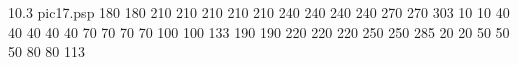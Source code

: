  10.3 pic17.psp 
{}{}{
 180 
 180 
 210 
 210 
 210 
 210 
 210 
 240 
 240 
 240 
 240 
 270 
 270 
 303 
 10 
 10 
 40 
 40 
 40 
 40 
 40 
 70 
 70 
 70 
 70 
 100 
 100 
 133 
 190 
 190 
 220 
 220 
 220 
 250 
 250 
 285 
 20 
 20 
 50 
 50 
 50 
 80 
 80 
 113 
}

